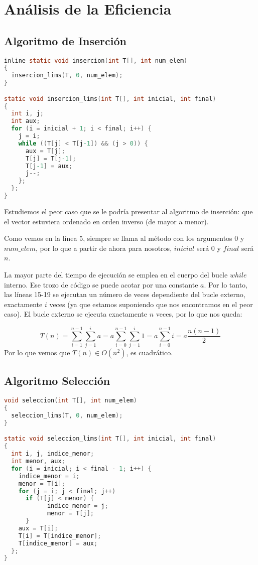 \section{Análisis de la Eficiencia}


\subsection{Algoritmo de Inserción}
\begin{lstlisting}[language=C]
inline static void insercion(int T[], int num_elem)
{
  insercion_lims(T, 0, num_elem);
}

static void insercion_lims(int T[], int inicial, int final)
{
  int i, j;
  int aux;
  for (i = inicial + 1; i < final; i++) {
    j = i;
    while ((T[j] < T[j-1]) && (j > 0)) {
      aux = T[j];
      T[j] = T[j-1];
      T[j-1] = aux;
      j--;
    };
  };
}
\end{lstlisting}

Estudiemos el peor caso que se le podría presentar al algoritmo de inserción: que el vector estuviera ordenado en orden inverso (de mayor a menor).

Como vemos en la línea 5, siempre se llama al método con los argumentos $0$ y $num\_elem$, por lo que a partir de ahora para nosotros, $inicial$ será $0$ y $final$ será $n$.

La mayor parte del tiempo de ejecución se emplea en el cuerpo del bucle $while$ interno. Ese trozo de código se puede acotar por una constante $a$. Por lo tanto, las líneas 15-19 se ejecutan un número de veces dependiente del bucle externo, exactamente $i$ veces (ya que estamos suponiendo que nos encontramos en el peor caso). El bucle externo se ejecuta exactamente $n$ veces, por lo que nos queda:

\[T(n)=\sum_{i=1}^{n-1}\sum_{j=1}^{i}a=a\sum_{i=0}^{n-1}\sum_{j=1}^{i}1=a\sum_{i=0}^{n-1}i=a\frac{n(n-1)}{2}\]
Por lo que vemos que $T(n)\in O(n^2)$, es cuadrático.

\newpage

\subsection{Algoritmo Selección}

\begin{lstlisting}[language=C]
void seleccion(int T[], int num_elem)
{
  seleccion_lims(T, 0, num_elem);
}

static void seleccion_lims(int T[], int inicial, int final)
{
  int i, j, indice_menor;
  int menor, aux;
  for (i = inicial; i < final - 1; i++) {
    indice_menor = i;
    menor = T[i];
    for (j = i; j < final; j++)
      if (T[j] < menor) {
			indice_menor = j;
			menor = T[j];
      }
    aux = T[i];
    T[i] = T[indice_menor];
    T[indice_menor] = aux;
  };
}
\end{lstlisting}

